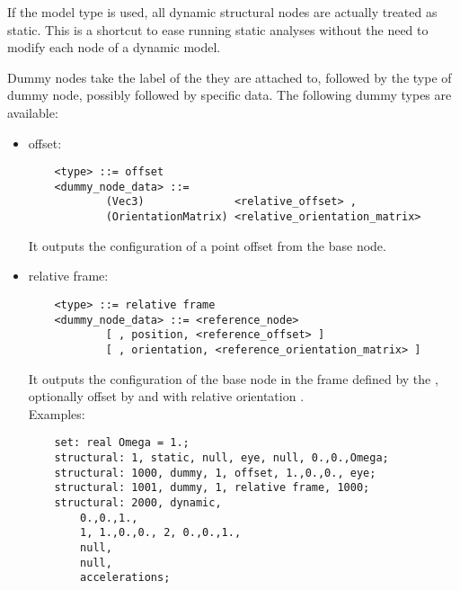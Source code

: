 If the  model type is used, all dynamic structural nodes
are actually treated as static.
This is a shortcut to ease running static analyses without the need
to modify each node of a dynamic model.

Dummy nodes take the label of the  they are attached to, 
followed by the type of dummy node, possibly followed by specific data.
The following dummy types are available:

\begin{itemize}

    \item offset:
    \begin{verbatim}
    <type> ::= offset
    <dummy_node_data> ::=
            (Vec3)              <relative_offset> ,
            (OrientationMatrix) <relative_orientation_matrix>
    \end{verbatim}
    It outputs the configuration of a point offset from the base node.
            
    \item relative frame:
    \begin{verbatim}
    <type> ::= relative frame
    <dummy_node_data> ::= <reference_node>
            [ , position, <reference_offset> ]
            [ , orientation, <reference_orientation_matrix> ]
    \end{verbatim}
    It outputs the configuration of the base node in the frame defined
    by the , optionally offset 
    by  and with relative orientation 
    .\\
    Examples:
    \begin{verbatim}
    set: real Omega = 1.;
    structural: 1, static, null, eye, null, 0.,0.,Omega;
    structural: 1000, dummy, 1, offset, 1.,0.,0., eye;
    structural: 1001, dummy, 1, relative frame, 1000;
    structural: 2000, dynamic,
        0.,0.,1.,
        1, 1.,0.,0., 2, 0.,0.,1.,
        null,
        null,
        accelerations;
    \end{verbatim}

\end{itemize}

